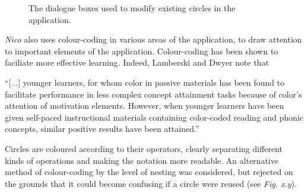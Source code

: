 \documentclass[12pt,twoside,notitlepage,xetex]{report}
\begin{document}
\begin{center}
\begin{figure}[H]
\begin{center}
\end{center}
\caption{The dialogue boxes used to modify existing circles in the application.}
\end{figure}
\end{center}

\emph{Nico} also uses colour-coding in various areas of the application, to
draw attention to important elements of the application.  Colour-coding has
been shown to faciliate more effective learning.  Indeed, Lamberski and Dwyer
note that
\begin{center}
\parbox[c]{\textwidth-2cm}{
\small
``[...] younger learners, for whom color in passive materials has been found to facilitate performance in less complex concept attainment tasks because of color's attention of motivation elements.  However, when younger learners have been given self-paced instructional materials containing color-coded reading and phonic concepts, similar positive results have been attained.'' \cite{Lamberski1983}
}
\end{center}
Circles are coloured according to their operators, clearly separating different
kinds of operations and making the notation more readable.  An alternative
method of colour-coding by the level of nesting was considered, but rejected on
the grounds that it could become confusing if a circle were reused (see
\emph{Fig. x.y}).
\end{document}
